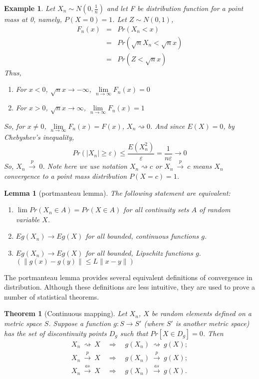 \documentclass[11pt]{article}
\newtheorem{theorem}{Theorem}[section]
\newtheorem{lemma}{Lemma}[section]
\newtheorem{example}{Example}[section]
\begin{document}
\begin{example}
Let $X_n \sim N(0,\frac{1}{n})$ and let F be distribution function for a point mass at 0, namely, $P(X=0)=1$. Let $Z\sim N(0,1)$,
\begin{eqnarray*}
F_n(x) &=& Pr(X_n < x) \\
&=& Pr(\sqrt{n}X_n < \sqrt{n}x) \\
&=& Pr(Z < \sqrt{n}x)
\end{eqnarray*}
Thus, 
\begin{enumerate}
\item For $x<0$, $\sqrt{n}x\longrightarrow -\infty$, $\lim\limits_{n\to\infty}F_n(x) = 0$
\item For $x>0$, $\sqrt{n}x\longrightarrow \infty$, $\lim\limits_{n\to\infty}F_n(x) = 1$
\end{enumerate}
So, for $x\neq 0$, $\lim\limits_{n\to\infty}F_n(x)=F(x)$, $X_n \rightsquigarrow 0$.
And since $E(X)=0$, by Chebyshev's inequality, 
$$
Pr(|X_n|\geq\varepsilon)\le\frac{E(X_n^2)}{\varepsilon} = \frac{1}{n\varepsilon} \longrightarrow 0
$$
So, $X_n \ \xrightarrow{p}\ 0$. Note here we use notation $X_n \rightsquigarrow c$ or $X_n \ \xrightarrow{p}\ c$ means $X_n$ convergence to a point mass distribution $P(X=c)=1$.
\end{example}
\begin{lemma}[portmanteau lemma]
The following statement are equivalent:
\begin{enumerate}
\item 
$\lim Pr(X_n \in A) = Pr(X \in A)$ for all continuity sets $A$ of random variable $X$.
\item $Eg(X_n) \longrightarrow Eg(X)$ for all bounded, continuous functions $g$.
\item $Eg(X_n) \longrightarrow Eg(X)$ for all bounded, Lipschitz functions $g$. $(\|g(x)-g(y)\| \leq L\|x-y\|)$
\end{enumerate}
\end{lemma}
The portmanteau lemma provides several equivalent definitions of convergence in distribution. Although these definitions are less intuitive, they are used to prove a number of statistical theorems.
\begin{theorem}[Continuous mapping]
Let ${X_n}$, $X$ be random elements defined on a metric space $S$. Suppose a function $g: S\longrightarrow S′$ (where $S′$ is another metric space) has the set of discontinuity points $D_g$ such that $Pr[X \in D_g] = 0$. Then
\begin{eqnarray*}
X_n \ \rightsquigarrow\ X \quad\Rightarrow\quad g(X_n)\ \rightsquigarrow\ g(X);\\
X_n \ \xrightarrow{p}\ X \quad\Rightarrow\quad g(X_n)\ \xrightarrow{p}\ g(X);\\
X_n \ \xrightarrow{\!\!as\!\!}\ X \quad\Rightarrow\quad g(X_n)\ \xrightarrow{\!\!as\!\!}\ g(X).\\
\end{eqnarray*}
\end{theorem}
\end{document}
